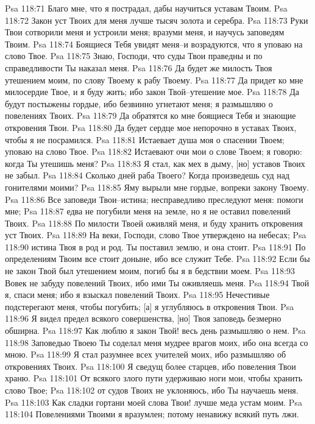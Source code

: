 Psa 118:71  Благо мне, что я пострадал, дабы научиться уставам Твоим.
Psa 118:72  Закон уст Твоих для меня лучше тысяч золота и серебра.
Psa 118:73  Руки Твои сотворили меня и устроили меня; вразуми меня, и научусь заповедям Твоим.
Psa 118:74  Боящиеся Тебя увидят меня--и возрадуются, что я уповаю на слово Твое.
Psa 118:75  Знаю, Господи, что суды Твои праведны и по справедливости Ты наказал меня.
Psa 118:76  Да будет же милость Твоя утешением моим, по слову Твоему к рабу Твоему.
Psa 118:77  Да придет ко мне милосердие Твое, и я буду жить; ибо закон Твой--утешение мое.
Psa 118:78  Да будут постыжены гордые, ибо безвинно угнетают меня; я размышляю о повелениях Твоих.
Psa 118:79  Да обратятся ко мне боящиеся Тебя и знающие откровения Твои.
Psa 118:80  Да будет сердце мое непорочно в уставах Твоих, чтобы я не посрамился.
Psa 118:81  Истаевает душа моя о спасении Твоем; уповаю на слово Твое.
Psa 118:82  Истаевают очи мои о слове Твоем; я говорю: когда Ты утешишь меня?
Psa 118:83  Я стал, как мех в дыму, [но] уставов Твоих не забыл.
Psa 118:84  Сколько дней раба Твоего? Когда произведешь суд над гонителями моими?
Psa 118:85  Яму вырыли мне гордые, вопреки закону Твоему.
Psa 118:86  Все заповеди Твои--истина; несправедливо преследуют меня: помоги мне;
Psa 118:87  едва не погубили меня на земле, но я не оставил повелений Твоих.
Psa 118:88  По милости Твоей оживляй меня, и буду хранить откровения уст Твоих.
Psa 118:89  На веки, Господи, слово Твое утверждено на небесах;
Psa 118:90  истина Твоя в род и род. Ты поставил землю, и она стоит.
Psa 118:91  По определениям Твоим все стоит доныне, ибо все служит Тебе.
Psa 118:92  Если бы не закон Твой был утешением моим, погиб бы я в бедствии моем.
Psa 118:93  Вовек не забуду повелений Твоих, ибо ими Ты оживляешь меня.
Psa 118:94  Твой я, спаси меня; ибо я взыскал повелений Твоих.
Psa 118:95  Нечестивые подстерегают меня, чтобы погубить; [а] я углубляюсь в откровения Твои.
Psa 118:96  Я видел предел всякого совершенства, [но] Твоя заповедь безмерно обширна.
Psa 118:97  Как люблю я закон Твой! весь день размышляю о нем.
Psa 118:98  Заповедью Твоею Ты соделал меня мудрее врагов моих, ибо она всегда со мною.
Psa 118:99  Я стал разумнее всех учителей моих, ибо размышляю об откровениях Твоих.
Psa 118:100  Я сведущ более старцев, ибо повеления Твои храню.
Psa 118:101  От всякого злого пути удерживаю ноги мои, чтобы хранить слово Твое;
Psa 118:102  от судов Твоих не уклоняюсь, ибо Ты научаешь меня.
Psa 118:103  Как сладки гортани моей слова Твои! лучше меда устам моим.
Psa 118:104  Повелениями Твоими я вразумлен; потому ненавижу всякий путь лжи.
